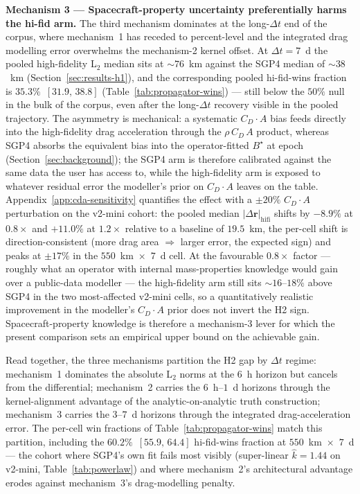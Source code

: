 \documentclass[10pt, letterpaper]{article}
\begin{document}
\textbf{Mechanism 3 --- Spacecraft-property uncertainty
preferentially harms the hi-fid arm.} The third mechanism
dominates at the long-$\Delta t$ end of the corpus, where
mechanism~1 has receded to percent-level and the integrated drag
modelling error overwhelms the mechanism-2 kernel offset. At
$\Delta t = 7$~d the pooled high-fidelity L$_{2}$ median sits at
$\sim 76$~km against the SGP4 median of $\sim 38$~km
(Section~\ref{sec:results-h1}), and the corresponding pooled
hi-fid-wins fraction is $35.3\%$~$[31.9,\,38.8]$
(Table~\ref{tab:propagator-wins}) --- still below the $50\%$ null
in the bulk of the corpus, even after the long-$\Delta t$ recovery
visible in the pooled trajectory. The asymmetry is mechanical: a
systematic $C_{D} \cdot A$ bias feeds directly into the
high-fidelity drag acceleration through the $\rho\,C_{D}\,A$
product, whereas SGP4 absorbs the equivalent bias into the
operator-fitted $B^{\!\star}$ at epoch
(Section~\ref{sec:background}); the SGP4 arm is therefore
calibrated against the same data the user has access to, while
the high-fidelity arm is exposed to whatever residual error the
modeller's prior on $C_{D} \cdot A$ leaves on the table.
Appendix~\ref{app:cda-sensitivity} quantifies the effect with a
$\pm 20\%$ $C_{D} \cdot A$ perturbation on the v2-mini cohort: the
pooled median $\lvert\Delta\mathbf{r}\rvert_{\mathrm{hifi}}$
shifts by $-8.9\%$ at $0.8\times$ and $+11.0\%$ at $1.2\times$
relative to a baseline of $19.5$~km, the per-cell shift is
direction-consistent (more drag area $\Rightarrow$ larger error,
the expected sign) and peaks at $\pm 17\%$ in the
$550$~km~$\times$~$7$~d cell. At the favourable $0.8\times$ factor
--- roughly what an operator with internal mass-properties
knowledge would gain over a public-data modeller --- the
high-fidelity arm still sits $\sim 16$--$18\%$ above SGP4 in the
two most-affected v2-mini cells, so a quantitatively realistic
improvement in the modeller's $C_{D} \cdot A$ prior does not
invert the H2 sign. Spacecraft-property knowledge is therefore a
mechanism-3 lever for which the present comparison sets an
empirical upper bound on the achievable gain.

Read together, the three mechanisms partition the H2 gap by
$\Delta t$ regime: mechanism~1 dominates the absolute L$_{2}$
norms at the $6$~h horizon but cancels from the differential;
mechanism~2 carries the $6$~h--$1$~d horizons through the
kernel-alignment advantage of the analytic-on-analytic truth
construction; mechanism~3 carries the $3$--$7$~d horizons through
the integrated drag-acceleration error. The per-cell win
fractions of Table~\ref{tab:propagator-wins} match this
partition, including the $60.2\%$~$[55.9,\,64.4]$ hi-fid-wins
fraction at $550$~km~$\times$~$7$~d --- the cohort where SGP4's
own fit fails most visibly (super-linear $\hat k = 1.44$ on
v2-mini, Table~\ref{tab:powerlaw}) and where mechanism~2's
architectural advantage erodes against mechanism~3's drag-modelling
penalty.
\end{document}
